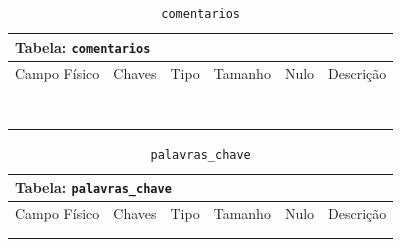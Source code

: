 \documentclass[12pt,a4paper]{article}
\begin{document}
\begin{center}
\begin{table}[h!]
	\caption{\texttt{comentarios}}
	\label{tabela:comentarios}
	\begin{tabular}{|p{2.5cm}|p{1cm}|p{1.25cm}|p{1.75cm}|p{1.25cm}|p{5cm}|}\hline	
		\multicolumn{6}{|p{16cm}|}{\cellcolor{cinzaClaro}  \centering Tabela: \texttt{comentarios}} \\ \hline %
		{\small Campo Físico}   & {\small Chaves} & {\small Tipo} & {\small Tamanho} & {\small Nulo} & {\small Descrição}\\\hline %
		
		{\tiny } & {\tiny } & {\tiny } & {\tiny } & {\tiny } &{\tiny }\\\hline
		{\tiny } & {\tiny } & {\tiny } & {\tiny } & {\tiny } &{\tiny }\\\hline
		{\tiny } & {\tiny } & {\tiny } & {\tiny } & {\tiny } &{\tiny }\\\hline
		{\tiny } & {\tiny } & {\tiny } & {\tiny } & {\tiny } &{\tiny }\\\hline
		{\tiny } & {\tiny } & {\tiny } & {\tiny } & {\tiny } &{\tiny }\\\hline
		{\tiny } & {\tiny } & {\tiny } & {\tiny } & {\tiny } &{\tiny }\\\hline
		{\tiny } & {\tiny } & {\tiny } & {\tiny } & {\tiny } &{\tiny }\\\hline
		{\tiny } & {\tiny } & {\tiny } & {\tiny } & {\tiny } &{\tiny }\\\hline
		
			
	\end{tabular}
\end{table}	
\end{center}

\begin{center}
\begin{table}[h!]
	\caption{\texttt{palavras\_chave}}
	\label{tabela:palavrasChave}
	\begin{tabular}{|p{2.5cm}|p{1cm}|p{1.25cm}|p{1.75cm}|p{1.25cm}|p{5cm}|}\hline	
		\multicolumn{6}{|p{16cm}|}{\cellcolor{cinzaClaro}  \centering Tabela: \texttt{palavras\_chave}} \\ \hline %
		{\small Campo Físico}   & {\small Chaves} & {\small Tipo} & {\small Tamanho} & {\small Nulo} & {\small Descrição}\\\hline %
		
		{\tiny } & {\tiny } & {\tiny } & {\tiny } & {\tiny } &{\tiny }\\\hline
		{\tiny } & {\tiny } & {\tiny } & {\tiny } & {\tiny } &{\tiny }\\\hline
			
	\end{tabular}
\end{table}	
\end{center}
\end{document}
